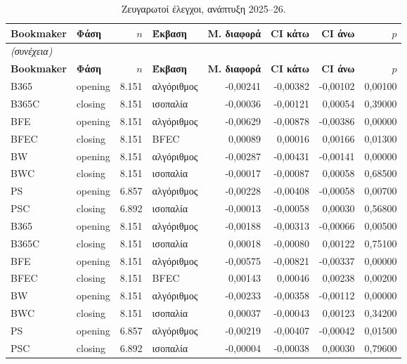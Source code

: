 {\footnotesize
\begin{longtable}{@{}llrlrrrr@{}}
\caption{Ζευγαρωτοί έλεγχοι, ανάπτυξη 2025--26.}\label{app:depsig}\\
\toprule \textbf{Bookmaker} & \textbf{Φάση} & \textbf{$n$} & \textbf{Έκβαση} & \textbf{Μ. διαφορά} & \textbf{CI κάτω} & \textbf{CI άνω} & \textbf{$p$} \\\midrule\endfirsthead
\multicolumn{8}{l}{\emph{(συνέχεια)}}\\\toprule \textbf{Bookmaker} & \textbf{Φάση} & \textbf{$n$} & \textbf{Έκβαση} & \textbf{Μ. διαφορά} & \textbf{CI κάτω} & \textbf{CI άνω} & \textbf{$p$} \\\midrule\endhead
\bottomrule\endfoot
B365 & opening & 8.151 & αλγόριθμος & -0,00241 & -0,00382 & -0,00102 & 0,00100 \\
B365C & closing & 8.151 & ισοπαλία & -0,00036 & -0,00121 & 0,00054 & 0,39000 \\
BFE & opening & 8.151 & αλγόριθμος & -0,00629 & -0,00878 & -0,00386 & 0,00000 \\
BFEC & closing & 8.151 & BFEC & 0,00089 & 0,00016 & 0,00166 & 0,01300 \\
BW & opening & 8.151 & αλγόριθμος & -0,00287 & -0,00431 & -0,00141 & 0,00000 \\
BWC & closing & 8.151 & ισοπαλία & -0,00017 & -0,00087 & 0,00058 & 0,68500 \\
PS & opening & 6.857 & αλγόριθμος & -0,00228 & -0,00408 & -0,00058 & 0,00700 \\
PSC & closing & 6.892 & ισοπαλία & -0,00013 & -0,00058 & 0,00030 & 0,56800 \\
B365 & opening & 8.151 & αλγόριθμος & -0,00188 & -0,00313 & -0,00066 & 0,00500 \\
B365C & closing & 8.151 & ισοπαλία & 0,00018 & -0,00080 & 0,00122 & 0,75100 \\
BFE & opening & 8.151 & αλγόριθμος & -0,00575 & -0,00821 & -0,00337 & 0,00000 \\
BFEC & closing & 8.151 & BFEC & 0,00143 & 0,00046 & 0,00238 & 0,00200 \\
BW & opening & 8.151 & αλγόριθμος & -0,00233 & -0,00358 & -0,00112 & 0,00000 \\
BWC & closing & 8.151 & ισοπαλία & 0,00037 & -0,00043 & 0,00123 & 0,34200 \\
PS & opening & 6.857 & αλγόριθμος & -0,00219 & -0,00407 & -0,00042 & 0,01500 \\
PSC & closing & 6.892 & ισοπαλία & -0,00004 & -0,00038 & 0,00030 & 0,79600 \\

\end{longtable}}
